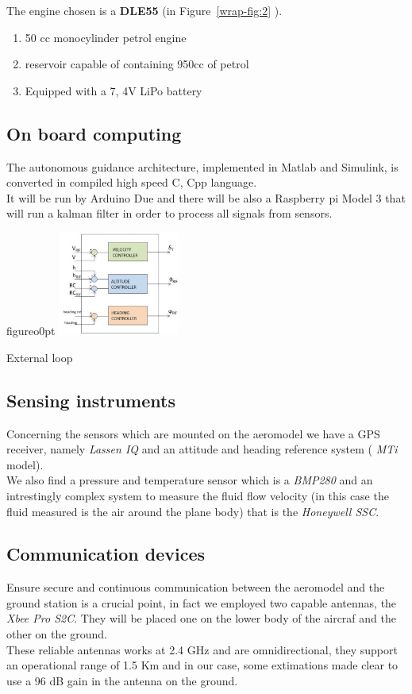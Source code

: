 \documentclass[oneside,onecolumn]{article}
\begin{document}
The engine chosen is a \textbf{DLE55} (in Figure~\ref{wrap-fig:2} ).
\begin{enumerate}
\item 50 cc monocylinder petrol engine
\item reservoir capable of containing 950cc of petrol
\item Equipped with a 7, 4V LiPo battery
\end{enumerate}


\subsection{On board computing}
The autonomous guidance architecture, implemented in Matlab and Simulink, is
converted in compiled high speed C, Cpp language.\\ It will be run by Arduino Due
and there will be also a Raspberry pi Model 3 that will run a kalman filter in
order to process all signals from sensors.


\begin{wrapfloat}{figure}{o}{0pt}
  \includegraphics[width=0.3\textwidth]{extLoop}
  \caption{External loop}\label{wrap-fig:3}
\end{wrapfloat} 



\subsection{Sensing instruments}
Concerning the sensors which are mounted on the aeromodel we have a GPS
receiver, namely \textit{ Lassen IQ} and an attitude and heading reference
system ( \textit{MTi} model).\\
We also find a pressure and temperature sensor which is a \textit{BMP280} and an
intrestingly complex system to measure the fluid flow velocity (in this case the
fluid measured is the air around the plane body) that is the \textit{Honeywell SSC}.
\subsection{Communication devices}
Ensure secure and continuous communication between the aeromodel and the ground
station is a crucial point, in fact we employed two capable antennas, the
\textit{Xbee Pro S2C}. They will be placed one on the lower body of the aircraf
and the other on the ground.\\
These reliable antennas works at 2.4 GHz and are omnidirectional, they support
an operational range of 1.5 Km and in our case, some extimations made clear to
use a 96 dB gain in the antenna on the ground.
\end{document}
